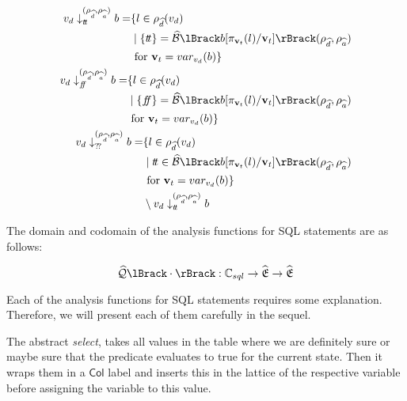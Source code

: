 \begin{align}
    \begin{split}
        v_d \downarrow_{\true}^{(\rho_{\ab{d}}, \rho_{\ab{a}})} b = &\{ l \in \rho_{\ab{d}}(v_d) \\
        &\mid \{ \true \} = \absboolsem{b[\pi_{\mathbf{v}_t}(l)/\mathbf{v}_t]}(\rho_{\ab{d}}, \rho_{\ab{a}}) \\
        &\text{ for } \mathbf{v}_t = var_{v_d}(b) \}
    \end{split}\\
    \begin{split}
        v_d \downarrow_{\false}^{(\rho_{\ab{d}}, \rho_{\ab{a}})} b = &\{ l \in \rho_{\ab{d}}(v_d) \\
        &\mid \{ \false \} = \absboolsem{b[\pi_{\mathbf{v}_t}(l)/\mathbf{v}_t]}(\rho_{\ab{d}}, \rho_{\ab{a}}) \\
        &\text{ for } \mathbf{v}_t = var_{v_d}(b) \}
    \end{split}\\
    \begin{split}
        v_d \downarrow_{\unknown}^{(\rho_{\ab{d}}, \rho_{\ab{a}})} b = &\{ l \in \rho_{\ab{d}}(v_d) \\
        &\mid \true \in \absboolsem{b[\pi_{\mathbf{v}_t}(l)/\mathbf{v}_t]}(\rho_{\ab{d}}, \rho_{\ab{a}}) \\
        &\text{ for } \mathbf{v}_t = var_{v_d}(b) \} \\
        &\setminus v_d \downarrow_{\true}^{(\rho_{\ab{d}}, \rho_{\ab{a}})} b
    \end{split}
\end{align}

The domain and codomain of the analysis functions for SQL statements are as follows:

\begin{equation}
    \abssqlsem{\cdot} : \mathbb{C}_{sql} \rightarrow \ab{\mathfrak{E}} \rightarrow \ab{\mathfrak{E}}\label{eq:equation-docomain-analysis}
\end{equation}

Each of the analysis functions for SQL statements requires some explanation.
Therefore, we will present each of them carefully in the sequel.

The abstract \textit{select}, takes all values in the table where we are definitely sure or maybe sure that the predicate evaluates to true for the current state.
Then it wraps them in a $\mathsf{Col}$ label and inserts this in the lattice of the respective variable before assigning the variable to this value.

